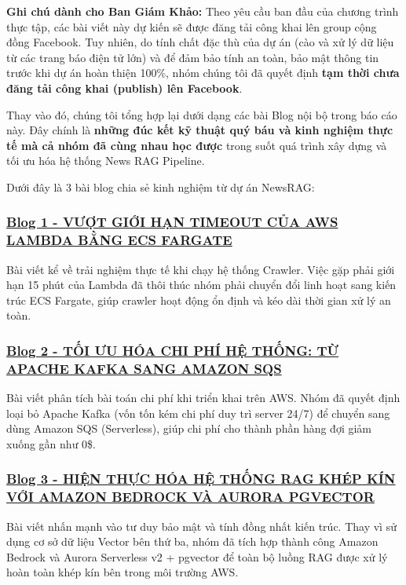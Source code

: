 \textbf{Ghi chú dành cho Ban Giám Khảo:} Theo yêu cầu ban đầu của chương
trình thực tập, các bài viết này dự kiến sẽ được đăng tải công khai lên
group cộng đồng Facebook. Tuy nhiên, do tính chất đặc thù của dự án (cào
và xử lý dữ liệu từ các trang báo điện tử lớn) và để đảm bảo tính an
toàn, bảo mật thông tin trước khi dự án hoàn thiện 100\%, nhóm chúng tôi
đã quyết định \textbf{tạm thời chưa đăng tải công khai (publish) lên
Facebook}.

Thay vào đó, chúng tôi tổng hợp lại dưới dạng các bài Blog nội bộ trong
báo cáo này. Đây chính là \textbf{những đúc kết kỹ thuật quý báu và kinh
nghiệm thực tế mà cả nhóm đã cùng nhau học được} trong suốt quá trình
xây dựng và tối ưu hóa hệ thống News RAG Pipeline.

Dưới đây là 3 bài blog chia sẻ kinh nghiệm từ dự án NewsRAG:

\hypertarget{blog-1---vux1b0ux1ee3t-giux1edbi-hux1ea1n-timeout-cux1ee7a-aws-lambda-bux1eb1ng-ecs-fargate}{%
\subsubsection{\texorpdfstring{\href{3.1-Blog1/}{Blog 1 - VƯỢT GIỚI HẠN
TIMEOUT CỦA AWS LAMBDA BẰNG ECS
FARGATE}}{Blog 1 - VƯỢT GIỚI HẠN TIMEOUT CỦA AWS LAMBDA BẰNG ECS FARGATE}}}

Bài viết kể về trải nghiệm thực tế khi chạy hệ thống Crawler. Việc gặp
phải giới hạn 15 phút của Lambda đã thôi thúc nhóm phải chuyển đổi linh
hoạt sang kiến trúc ECS Fargate, giúp crawler hoạt động ổn định và kéo
dài thời gian xử lý an toàn.

\hypertarget{blog-2---tux1ed1i-ux1b0u-huxf3a-chi-phuxed-hux1ec7-thux1ed1ng-tux1eeb-apache-kafka-sang-amazon-sqs}{%
\subsubsection{\texorpdfstring{\href{3.2-Blog2/}{Blog 2 - TỐI ƯU HÓA CHI
PHÍ HỆ THỐNG: TỪ APACHE KAFKA SANG AMAZON
SQS}}{Blog 2 - TỐI ƯU HÓA CHI PHÍ HỆ THỐNG: TỪ APACHE KAFKA SANG AMAZON SQS}}}

Bài viết phân tích bài toán chi phí khi triển khai trên AWS. Nhóm đã
quyết định loại bỏ Apache Kafka (vốn tốn kém chi phí duy trì server
24/7) để chuyển sang dùng Amazon SQS (Serverless), giúp chi phí cho
thành phần hàng đợi giảm xuống gần như 0\$.

\hypertarget{blog-3---hiux1ec7n-thux1ef1c-huxf3a-hux1ec7-thux1ed1ng-rag-khuxe9p-kuxedn-vux1edbi-amazon-bedrock-vuxe0-aurora-pgvector}{%
\subsubsection{\texorpdfstring{\href{3.3-Blog3/}{Blog 3 - HIỆN THỰC HÓA
HỆ THỐNG RAG KHÉP KÍN VỚI AMAZON BEDROCK VÀ AURORA
PGVECTOR}}{Blog 3 - HIỆN THỰC HÓA HỆ THỐNG RAG KHÉP KÍN VỚI AMAZON BEDROCK VÀ AURORA PGVECTOR}}}

Bài viết nhấn mạnh vào tư duy bảo mật và tính đồng nhất kiến trúc. Thay
vì sử dụng cơ sở dữ liệu Vector bên thứ ba, nhóm đã tích hợp thành công
Amazon Bedrock và Aurora Serverless v2 + pgvector để toàn bộ luồng RAG
được xử lý hoàn toàn khép kín bên trong môi trường AWS.

